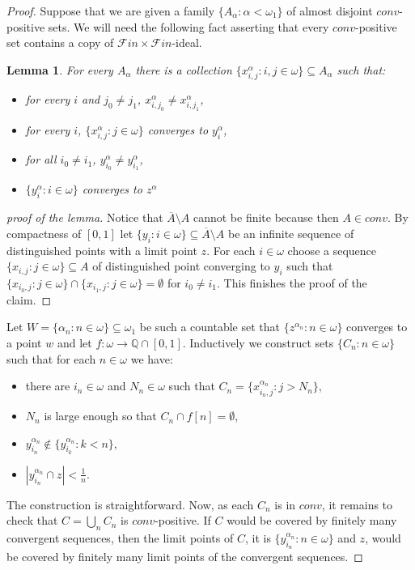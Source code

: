 \documentclass[a4paper]{amsart}
\newtheorem{lemma}[theorem]{Lemma}
\newcommand{\FF}{\mathcal{F}in\times\mathcal{F}in}
\newcommand{\conv}{conv}
\begin{document}
\begin{proof}
    Suppose that we are given a family $\{A_{\alpha}:\alpha<\omega_{1}\}$ of almost disjoint $\conv$-positive sets. We will need the following fact asserting that every $\conv$-positive set contains a copy of $\FF$-ideal.
    \begin{lemma}\label{lemmaConvPositive}
        For every $A_{\alpha}$ there is a collection $\{x^{\alpha}_{i,j}:i,j\in\omega\}\subseteq A_{\alpha}$ such that:
        \begin{itemize}
            \item[--] for every $i$ and $j_{0}\neq j_{1}$, $x^{\alpha}_{i,j_{0}}\neq x^{\alpha}_{i,j_{1}}$,
            \item[--] for every $i$, $\{x^{\alpha}_{i,j}:j\in\omega\}$ converges to $y^{\alpha}_{i}$,
            \item[--] for all $i_{0}\neq i_{1}$, $y^{\alpha}_{i_{0}}\neq y^{\alpha}_{i_{1}}$,
            \item[--] $\{y^{\alpha}_{i}:i\in\omega\}$ converges to $z^{\alpha}$
        \end{itemize}
    \end{lemma}
    \begin{proof}[proof of the lemma]
        Notice that $\overline{A}\setminus A$ cannot be finite because then $A\in\conv$. By compactness of $[0,1]$ let $\{y_{i}:i\in\omega\}\subseteq\overline{A}\setminus A$ be an infinite sequence of distinguished points with a limit point $z$. For each $i\in\omega$ choose a sequence $\{x_{i,j}:j\in\omega\}\subseteq A$ of distinguished point converging to $y_{i}$ such that $\{x_{i_{0},j}:j\in\omega\}\cap\{x_{i_{1},j}:j\in\omega\}=\emptyset$ for $i_{0}\neq i_{1}$. This finishes the proof of the claim.
    \end{proof}
    Let $W=\{\alpha_{n}:n\in\omega\}\subseteq\omega_{1}$ be such a countable set that $\{z^{\alpha_{n}}:n\in\omega\}$ converges to a point $w$ and let $f:\omega\rightarrow\mathbb{Q}\cap[0,1]$. Inductively we construct sets $\{C_{n}:n\in\omega\}$ such that for each $n\in\omega$ we have:
    \begin{itemize}
        \item[--] there are $i_{n}\in\omega$ and $N_{n}\in\omega$ such that $C_{n}=\{x^{\alpha_{n}}_{i_{n},j}:j>N_{n}\}$,
        \item[--] $N_{n}$ is large enough so that $C_{n}\cap f[n]=\emptyset$,
        \item[--] $y^{\alpha_{n}}_{i_{n}}\notin\{y^{\alpha_{n}}_{i_{k}}:k<n\}$,
        \item[--] $|y^{\alpha_{n}}_{i_{n}}\cap z|<\frac{1}{n}$.
    \end{itemize}
    The construction is straightforward. Now, as each $C_{n}$ is in $\conv$, it remains to check that $C=\bigcup_{n}C_{n}$ is $\conv$-positive. If $C$ would be covered by finitely many convergent sequences, then the limit points of $C$, it is $\{y^{\alpha_{n}}_{i_{n}}:n\in\omega\}$ and $z$, would be covered by finitely many limit points of the convergent sequences. 
\end{proof}
\end{document}
